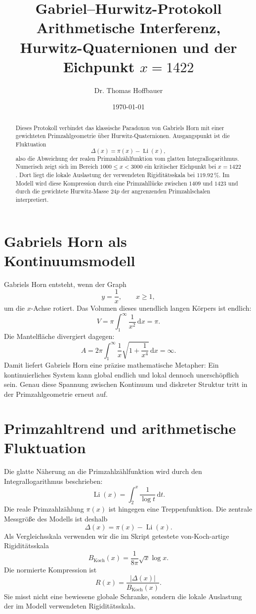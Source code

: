 \documentclass[11pt,a4paper]{article}
\title{\textbf{Gabriel--Hurwitz-Protokoll}\\
\large Arithmetische Interferenz, Hurwitz-Quaternionen und der Eichpunkt \(x=1422\)}
\author{Dr. Thomas Hoffbauer}
\date{\today}
\newcommand{\Li}{\operatorname{Li}}
\newcommand{\piPrime}{\pi}
\newcommand{\Deviation}{\Delta}
\newcommand{\Koch}{B_{\mathrm{Koch}}}
\begin{document}
\maketitle

\begin{abstract}
Dieses Protokoll verbindet das klassische Paradoxon von Gabriels Horn mit einer
gewichteten Primzahlgeometrie über Hurwitz-Quaternionen. Ausgangspunkt ist die
Fluktuation
\[
  \Deviation(x) = \piPrime(x)-\Li(x),
\]
also die Abweichung der realen Primzahlzählfunktion vom glatten
Integrallogarithmus. Numerisch zeigt sich im Bereich \(1000 \leq x < 3000\) ein
kritischer Eichpunkt bei \(x=1422\). Dort liegt die lokale Auslastung der
verwendeten Rigiditätsskala bei \(\num{119.92}\,\%\). Im Modell wird diese
Kompression durch eine Primzahllücke zwischen \(1409\) und \(1423\) und durch
die gewichtete Hurwitz-Masse \(24p\) der angrenzenden Primzahlschalen
interpretiert.
\end{abstract}

\section{Gabriels Horn als Kontinuumsmodell}

Gabriels Horn entsteht, wenn der Graph
\[
  y=\frac{1}{x}, \qquad x \geq 1,
\]
um die \(x\)-Achse rotiert. Das Volumen dieses unendlich langen Körpers ist
endlich:
\[
  V=\pi\int_{1}^{\infty}\frac{1}{x^2}\,\mathrm{d}x=\pi.
\]
Die Mantelfläche divergiert dagegen:
\[
  A=2\pi\int_{1}^{\infty}\frac{1}{x}\sqrt{1+\frac{1}{x^4}}\,\mathrm{d}x
  =\infty.
\]
Damit liefert Gabriels Horn eine präzise mathematische Metapher: Ein
kontinuierliches System kann global endlich und lokal dennoch unerschöpflich
sein. Genau diese Spannung zwischen Kontinuum und diskreter Struktur tritt in
der Primzahlgeometrie erneut auf.

\section{Primzahltrend und arithmetische Fluktuation}

Die glatte Näherung an die Primzahlzählfunktion wird durch den
Integrallogarithmus beschrieben:
\[
  \Li(x)=\int_{2}^{x}\frac{1}{\log t}\,\mathrm{d}t.
\]
Die reale Primzahlzählung \(\piPrime(x)\) ist hingegen eine Treppenfunktion.
Die zentrale Messgröße des Modells ist deshalb
\[
  \Deviation(x)=\piPrime(x)-\Li(x).
\]
Als Vergleichsskala verwenden wir die im Skript getestete von-Koch-artige
Rigiditätsskala
\[
  \Koch(x)=\frac{1}{8\pi}\sqrt{x}\log x.
\]
Die normierte Kompression ist
\[
  R(x)=\frac{|\Deviation(x)|}{\Koch(x)}.
\]
Sie misst nicht eine bewiesene globale Schranke, sondern die lokale Auslastung
der im Modell verwendeten Rigiditätsskala.
\end{document}
